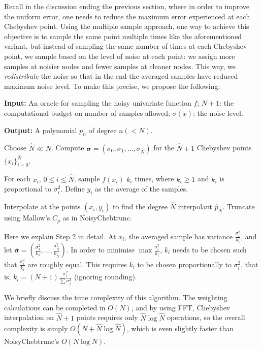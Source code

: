 \documentclass[pdflatex,sn-mathphys-num]{sn-jnl}%
\theoremstyle{thmstyleone}%
\theoremstyle{thmstyletwo}%
\theoremstyle{thmstylethree}%
\begin{document}
Recall in the discussion ending the previous section, where in order to improve the uniform error, one needs to reduce the maximum error experienced at each Chebyshev point. Using the multiple sample approach, one way to achieve this objective is to sample the same point multiple times like the aforementioned variant, but instead of sampling the same number of times at each Chebyshev point, we sample based on the level of noise at each point: we assign more samples at noisier nodes and fewer samples at cleaner nodes. This way, we \emph{redistribute} the noise so that in the end the averaged samples have reduced maximum noise level. To make this precise, we propose the following:

\begin{algorithm}
	\caption{Special case of HeteroChebtrunc under known $\sigma(x)$.}
	\label{alg:noisychebtrunchetero} 
	\textbf{Input:} An oracle for sampling the noisy univariate function $f$; $N+1$: the computational budget on number of samples allowed; $\sigma(x)$: the noise level.
	
	\textbf{Output:} A polynomial $p_n$ of degree $n( < N)$.
	\begin{algorithmic}[1]
		\item Choose $\hat{N} \ll N$. Compute $\bm{\sigma} = (\sigma_0, \sigma_1,...,\sigma_{\hat{N}})$ for the $\hat{N}+1$ Chebyshev points $\{ x_i \}_{i=0}^{\hat{N}}$.
		\item For each $x_i$, $ 0\leq i \leq \hat{N}$,  sample $f(x_i)$ $k_i$ times, where $k_i\geq 1$ and $k_i$ is proportional to $\sigma_i^2$. Define $y_i$ as the average of the samples. 
		\item Interpolate at the points $(x_i, y_i)$ to find the degree $\hat{N}$ interpolant $\hat{p}_{\hat{N}}$. Truncate using Mallow's $C_p$ as in NoisyChebtrunc. 
	\end{algorithmic}
\end{algorithm}

Here we explain Step 2 in detail. At $x_i$, the averaged sample has variance $ \frac{\sigma^2_i}{{k_i}} $, and let $\bm{\bar{\sigma}} = (\frac{\sigma^2_1}{k_1}, ..., \frac{\sigma^2_{\hat{N}}}{{k_{\hat{N}}}} )$. In order to minimise $\max \frac{\sigma^2_i}{{k_i}}$, $k_i$ needs to be chosen such that $\frac{\sigma^2_i}{k_i}$ are roughly equal. This requires $k_i$ to be chosen proportionally to $\sigma_i^2$, that is, $k_i = (N+1)\frac{\sigma_i^2}{\sum \sigma_j^2}$ (ignoring rounding).

We briefly discuss the time complexity of this algorithm. The weighting calculations can be completed in $O(N) $, and by using FFT, Chebyshev interpolation on $\hat{N}+1$ points requires only $\hat{N}\log \hat{N}$ operations, so the overall complexity is simply $O(N+\hat{N}\log\hat{N})$, which is even slightly faster than NoisyChebtrunc's $O(N\log N)$.
\end{document}

